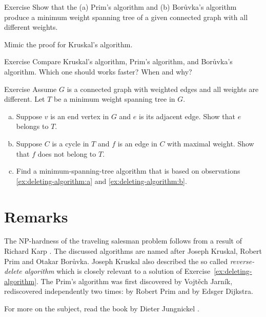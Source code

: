 \begin{thm}{Exercise}
Show that the (a) Prim's algorithm and (b) Borůvka's algorithm produce a minimum weight spanning tree of a given connected graph with all different weights.
\end{thm}

 Mimic the proof for Kruskal’s algorithm.

\begin{thm}{Exercise}
Compare Kruskal’s algorithm, Prim's algorithm, and Borůvka's algorithm.
Which one should works faster?
When and why?
\end{thm}

\begin{thm}{Exercise}\label{ex:deleting-algorithm}
Assume $G$ is a connected graph with weighted edges and all weights are different.
Let $T$ be a minimum weight spanning tree in $G$.
\begin{enumerate}[(a)]
\item\label{ex:deleting-algorithm:a} Suppose $v$ is an end vertex in $G$ and $e$ is its adjacent edge.
Show that $e$ belongs to $T$.
\item\label{ex:deleting-algorithm:b} Suppose $C$ is a cycle in $T$ and $f$ is an edge in $C$ with maximal weight.
Show that $f$ does not belong to $T$.
\item Find a minimum-spanning-tree algorithm that is based on observations \ref{ex:deleting-algorithm:a} and \ref{ex:deleting-algorithm:b}.
\end{enumerate}
\end{thm}

\section*{Remarks}

The NP-hardness of the traveling salesman problem follows from a result of Richard Karp \cite{karp}.
The discussed algorithms are named after Joseph Kruskal, Robert Prim and Otakar Borůvka.
Joseph Kruskal also described the so called \emph{reverse-delete algorithm} \cite{kruskal} which is closely relevant to a solution of Exercise~\ref{ex:deleting-algorithm}.
The Prim's algorithm was first discovered by Vojtěch Jarník,
rediscovered  independently two times: by Robert Prim and by Edsger Dijkstra.

For more on the subject, read the book by Dieter Jungnickel \cite{jungnickel}.

